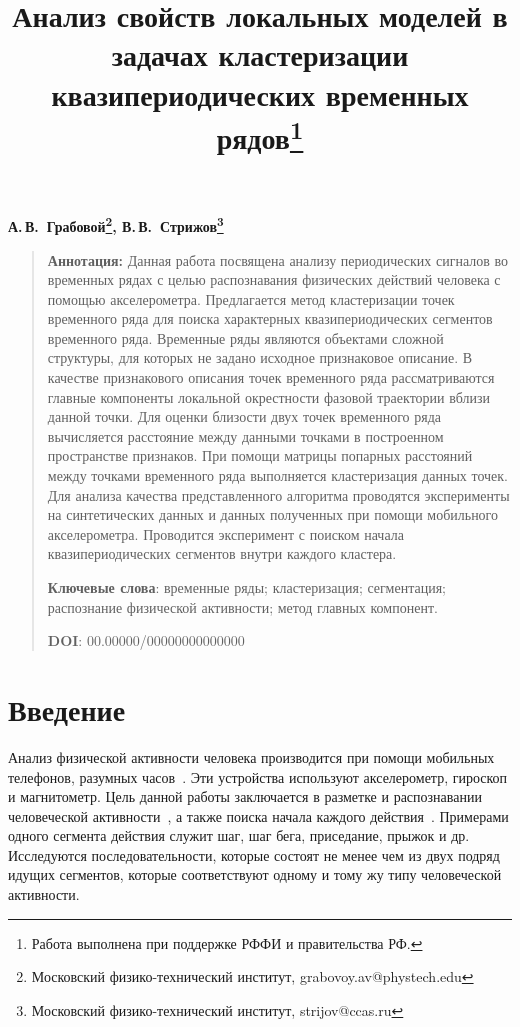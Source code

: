 \documentclass[12pt, twoside]{article}
\numberwithin{equation}{section}
\begin{document}
\title{\bf Анализ свойств локальных моделей в задачах кластеризации квазипериодических временных рядов\thanks{Работа выполнена при поддержке РФФИ и правительства РФ.}}
\date{}
\author{}
\maketitle

\begin{center}
\bf
А.\,В.~Грабовой\footnote{Московский физико-технический институт, grabovoy.av@phystech.edu}, В.\,В.~Стрижов\footnote{Московский физико-технический институт, strijov@ccas.ru}

\end{center}

{\centering\begin{quote}
\textbf{Аннотация:} Данная работа посвящена анализу периодических сигналов во временных рядах с целью распознавания физических действий человека с помощью акселерометра. 
Предлагается метод кластеризации точек временного ряда для поиска характерных квазипериодических сегментов временного ряда. 
Временные ряды являются объектами сложной структуры, для которых не задано исходное признаковое описание. 
В качестве признакового описания точек временного ряда рассматриваются главные компоненты локальной окрестности фазовой траектории вблизи данной точки. 
Для оценки близости двух точек временного ряда вычисляется расстояние между данными точками в построенном пространстве признаков. 
При помощи матрицы попарных расстояний между точками временного ряда выполняется кластеризация данных точек. 
Для анализа качества представленного алгоритма проводятся эксперименты на синтетических данных и данных полученных при помощи мобильного акселерометра. 
Проводится эксперимент с поиском начала квазипериодических сегментов внутри каждого кластера.


\smallskip
\textbf{Ключевые слова}: временные ряды; кластеризация; сегментация; распознание физической активности; метод главных компонент.

\smallskip
\textbf{DOI}: 00.00000/00000000000000
\end{quote}
}

\section{Введение}
Анализ физической активности человека производится при помощи мобильных телефонов, разумных часов~\cite{kwapisz2010, wang2014}. 
Эти устройства используют акселерометр, гироскоп и магнитометр. 
Цель данной работы заключается в  разметке и распознавании человеческой активности~\cite{Ignatov2015, Olivares2012, cinar2018}, а также поиска начала каждого действия~\cite{motrenko2015}. 
Примерами одного сегмента действия служит шаг, шаг бега, приседание, прыжок и др. 
Исследуются последовательности, которые состоят не менее чем из двух подряд идущих сегментов, которые соответствуют одному и тому жу типу человеческой активности.
\end{document}
